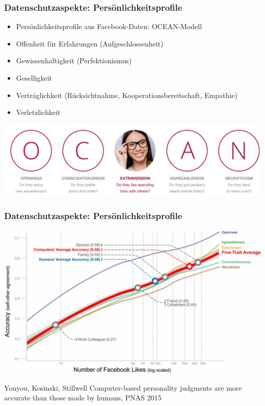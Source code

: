 \begin{frame}
  \frametitle{Datenschutzaspekte: Persönlichkeitsprofile}

\begin{itemize}
\item Persönlichkeitsprofile aus Facebook-Daten: OCEAN-Modell
\item Offenheit für Erfahrungen (Aufgeschlossenheit)
\item Gewissenhaftigkeit (Perfektionismus)
\item Geselligkeit
\item Verträglichkeit (Rücksichtnahme, Kooperationsbereitschaft, Empathie)
\item Verletzlichkeit
\end{itemize}

\includegraphics[scale=.7]{fig1/ocean.png}
\end{frame}


\begin{frame}
  \frametitle{Datenschutzaspekte: Persönlichkeitsprofile}


\includegraphics[scale=.5]{fig1/ocean-diagramm.png}

\footnotesize{Youyou, Kosinski, Stillwell Computer-based personality judgments are more accurate than those made by humans, PNAS 2015
}
\end{frame}

